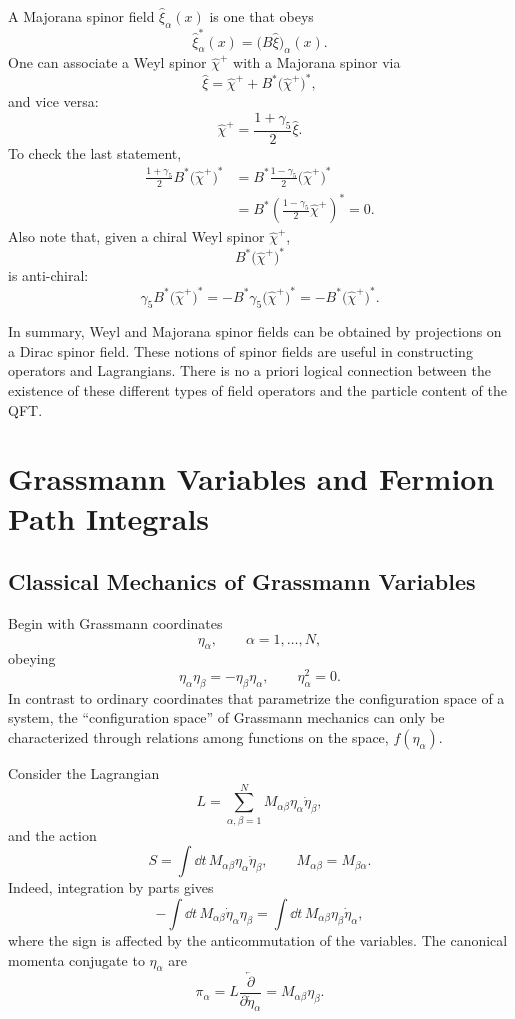 A Majorana spinor field \(\widehat\xi_\alpha(x)\) is one that obeys
\[
  \widehat\xi_\alpha^*(x)=\bigl(B\widehat\xi\bigr)_\alpha(x).
\]
One can associate a Weyl spinor \(\widehat\chi^+\) with a Majorana
spinor via
\[
  \widehat\xi
  =
  \widehat\chi^+
  +
  B^*\bigl(\widehat\chi^+\bigr)^*,
\]
and vice versa:
\[
  \widehat\chi^+
  =
  \frac{1+\gamma_5}{2}\widehat\xi.
\]
To check the last statement,
\[
\begin{aligned}
  \frac{1+\gamma_5}{2}
  B^*\bigl(\widehat\chi^+\bigr)^*
  &=
  B^*\frac{1-\gamma_5}{2}
  \bigl(\widehat\chi^+\bigr)^*
  \\
  &=
  B^*
  \left(
    \frac{1-\gamma_5}{2}\widehat\chi^+
  \right)^*
  =
  0.
\end{aligned}
\]
Also note that, given a chiral Weyl spinor \(\widehat\chi^+\),
\[
  B^*\bigl(\widehat\chi^+\bigr)^*
\]
is anti-chiral:
\[
  \gamma_5 B^*\bigl(\widehat\chi^+\bigr)^*
  =
  -B^*\gamma_5\bigl(\widehat\chi^+\bigr)^*
  =
  -B^*\bigl(\widehat\chi^+\bigr)^*.
\]

In summary, Weyl and Majorana spinor fields can be obtained by
projections on a Dirac spinor field.  These notions of spinor fields are
useful in constructing operators and Lagrangians.  There is no a priori
logical connection between the existence of these different types of
field operators and the particle content of the QFT.

\section{Grassmann Variables and Fermion Path Integrals}

\subsection{Classical Mechanics of Grassmann Variables}

Begin with Grassmann coordinates
\[
  \eta_\alpha,\qquad \alpha=1,\ldots,N,
\]
obeying
\[
  \eta_\alpha\eta_\beta=-\eta_\beta\eta_\alpha,
  \qquad
  \eta_\alpha^2=0.
\]
In contrast to ordinary coordinates that parametrize the configuration
space of a system, the ``configuration space'' of Grassmann mechanics can
only be characterized through relations among functions on the space,
\(f(\eta_\alpha)\).

Consider the Lagrangian
\[
  L=\sum_{\alpha,\beta=1}^N M_{\alpha\beta}\eta_\alpha\dot\eta_\beta,
\]
and the action
\[
  S=\int\dd t\,M_{\alpha\beta}\eta_\alpha\dot\eta_\beta,
  \qquad M_{\alpha\beta}=M_{\beta\alpha}.
\]
Indeed, integration by parts gives
\[
  -\int\dd t\,M_{\alpha\beta}\dot\eta_\alpha\eta_\beta
  =
  \int\dd t\,M_{\alpha\beta}\eta_\beta\dot\eta_\alpha,
\]
where the sign is affected by the anticommutation of the variables.
The canonical momenta conjugate to \(\eta_\alpha\) are
\[
  \pi_\alpha
  =
  L\frac{\overleftarrow{\partial}}{\partial\dot\eta_\alpha}
  =
  M_{\alpha\beta}\eta_\beta.
\]

